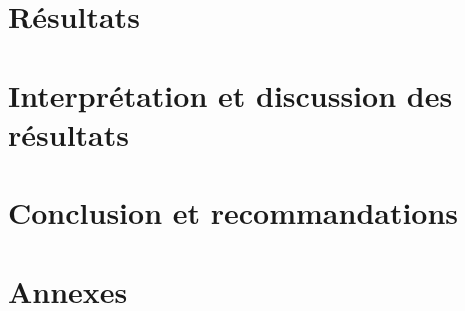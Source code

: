 \documentclass[12pt, letterpaper]{article}
\begin{document}
\section{Résultats}

\section{Interprétation et discussion des résultats}

\section{Conclusion et recommandations}

\clearpage 
\printbibliography[heading=bibintoc,title={Références\label{bib:references}}] 
\clearpage 
\section{Annexes}

\end{document}
